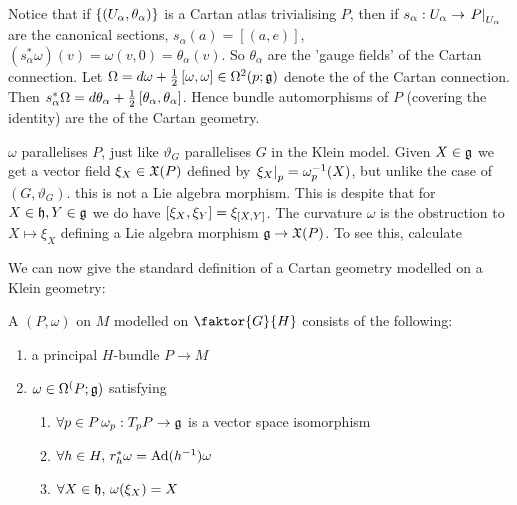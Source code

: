 \documentclass{article}
\begin{document}
Notice that if $\pbrace{(U_\alpha,\theta_\alpha)}$ is a Cartan atlas trivialising $P$, then if $s_\alpha : U_\alpha \to \ev{P}{U_\alpha}$ are the canonical sections, $s_\alpha(a) = [(a,e)]$, $(s_\alpha^\ast \omega)(v) = \omega(v,0) = \theta_\alpha(v)$. So $\theta_\alpha$ are the 'gauge fields' of the Cartan connection. Let $\Omega = d\omega + \frac{1}{2} \comm[\omega]{\omega}\in \Omega^2(p;\mf{g})$ denote the  of the Cartan connection. Then $s_\alpha^\ast \Omega = d\theta_\alpha + \frac{1}{2} \comm[\theta_\alpha]{\theta_\alpha}$. Hence bundle automorphisms of $P$ (covering the identity) are the  of the Cartan geometry. 

\begin{remark}
$\omega$ parallelises $P$, just like $\vartheta_G$ parallelises $G$ in the Klein model. Given $X \in \mf{g}$ we get a vector field $\xi_X \in \mf{X}(P)$ defined by $\ev{\xi_X}{p} = \omega^{-1}_p(X)$, but unlike the case of $(G,\vartheta_G)$. this is not a Lie algebra morphism. This is despite that for $X \in \mf{h}, Y \in \mf{g}$ we do have $\comm[\xi_X]{\xi_Y} = \xi_{\comm[X]{Y}}$. The curvature $\omega$ is the obstruction to $X \mapsto \xi_X$ defining a Lie algebra morphism $\mf{g} \to \mf{X}(P)$. To see this, calculate
\end{remark}

We can now give the standard definition of a Cartan geometry modelled on a Klein geometry:

\begin{definition}
A  $(P,\omega)$ on $M$ modelled on $\faktor{G}{H}$ consists of the following:
\begin{enumerate}
    \item a principal $H$-bundle $P \to M$
    \item $\omega \in \Omega^(P;\mf{g})$ satisfying 
    \begin{enumerate}
        \item $\forall p \in P\, \omega_p : T_pP \to \mf{g}$ is a vector space isomorphism 
        \item $\forall h \in H, \, r_h^\ast \omega = \Ad(h^{-1}) \omega$
        \item $\forall X \in \mf{h}, \, \omega(\xi_X) = X$
    \end{enumerate}
\end{enumerate}
\end{definition}
\end{document}
